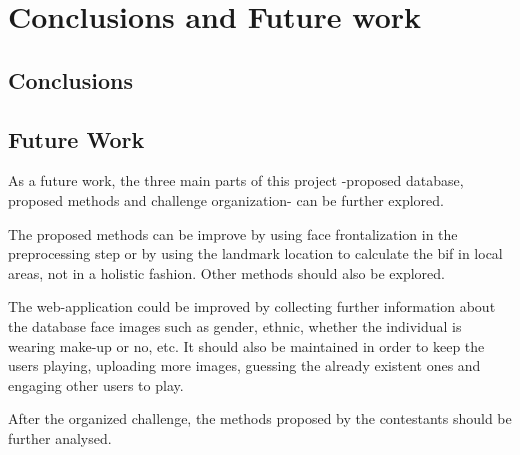 \chapter{Conclusions and Future work} \label{chap:conclusions}

\section{Conclusions}


\section{Future Work}

As a future work, the three main parts of this project -proposed database, proposed methods and challenge organization- can be further explored.

The proposed methods can be improve by using face frontalization in the preprocessing step or by using the landmark location to calculate the \gls{bif} in local areas, not in a holistic fashion. Other methods should also be explored.

The web-application could be improved by collecting further information about the database face images such as gender, ethnic, whether the individual is wearing make-up or no, etc. It should also be maintained in order to keep the users playing, uploading more images, guessing the already existent ones and engaging other users to play.

After the organized challenge, the methods proposed by the contestants should be further analysed.
